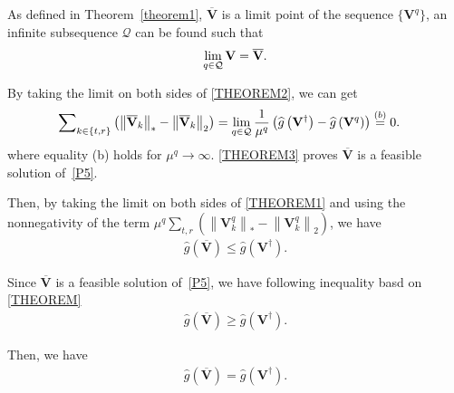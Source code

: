 \documentclass[12pt, draftclsnofoot, onecolumn]{IEEEtran}
\begin{document}
As defined in Theorem~\ref{theorem1}, $\overline{\mathbf{V}}$ is a limit point of the sequence $\{\mathbf{V}^q\}$, an infinite subsequence $\mathcal{Q}$ can be found such that\vspace{-0.2cm}
\begin{equation}
\begin{aligned}
\mathop {\lim }\limits_{q \in \mathcal{Q}} {{\bf{V}}} = \overline{\mathbf{V}}.
\end{aligned}\vspace{-0.2cm}
\end{equation}

By taking the limit on both sides of \eqref{THEOREM2}, we can get
\begin{equation}\label{THEOREM3}
\begin{aligned}
\sum\nolimits_{k\in\{t,r\}}&\left(\left\|\overline{\mathbf{V}}_k\right\|_*-\left\|\overline{\mathbf{V}}_k\right\|_2\right)=\mathop {\lim }\limits_{q \in \mathcal{Q}} \frac{1}{\mu^q}\left(\widehat{g}\left(\mathbf{V}^\dag\right)-\widehat{g}\left(\mathbf{V}^q\right)\right)\buildrel (b) \over=0.
\end{aligned}
\end{equation} 
where equality (b) holds for $\mu^q \to \infty$. \eqref{THEOREM3} proves $\overline{\mathbf{V}}$ is a feasible solution of~\eqref{P5}.

Then, by taking the limit on both sides of \eqref{THEOREM1} and using the nonnegativity of the term $\mu^q\sum_{t,r}\left(\left\|{\mathbf{V}}_k^q\right\|_*-\left\|{\mathbf{V}}_k^q\right\|_2\right)$, we have 
\begin{equation}\label{THEOREM4}
\begin{aligned}
\widehat{g}\left(\overline{\mathbf{V}}\right) \le \widehat{g}\left(\mathbf{V}^\dag\right).
\end{aligned}
\end{equation} 

Since $\overline{\mathbf{V}}$ is a feasible solution of~\eqref{P5}, we have following inequality basd on \eqref{THEOREM}
\begin{equation}
\begin{aligned}
\widehat{g}\left(\overline{\mathbf{V}}\right) \ge \widehat{g}\left(\mathbf{V}^\dag\right).
\end{aligned}
\end{equation}

Then, we have 
\begin{equation}
\begin{aligned}
\widehat{g}\left(\overline{\mathbf{V}}\right) = \widehat{g}\left(\mathbf{V}^\dag\right).
\end{aligned}
\end{equation}
\end{document}
